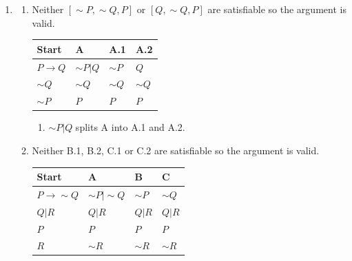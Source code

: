 \documentclass{article}
\begin{document}
\begin{enumerate}
    \newpage
    \item 
    \begin{enumerate}

        \item Neither $[\sim P, \sim Q, P]$ or $[Q, \sim Q, P]$ are satisfiable so the argument is valid.
        \begin{center}
        \setlength{\tabcolsep}{10pt}
        \centering
        \begin{tabular}{ p{1.2cm}|p{1.1cm}|p{1cm}|p{1cm}}
        
            Start & A & A.1 & A.2\\
            \hline
            $P \rightarrow Q$ & $\sim P |Q$ & $\sim P$    & $Q$\\
            $\sim Q$          & $\sim Q$    & $\sim Q$    & $\sim Q$\\ \cline{1-1}
            $\sim P$          & $P$         & $P$         & $P$\\
        \end{tabular}
        \end{center}

        \vspace{20px}
        \begin{enumerate}
            \item $\sim P|Q$ splits A into A.1 and A.2. 
        \end{enumerate}
        
        \vspace{100px}
        
        \item Neither B.1, B.2, C.1 or C.2 are satisfiable so the argument is valid.
        \begin{center}
        \setlength{\tabcolsep}{10pt}
        \centering
        \begin{tabular}{ p{1.4cm}|p{1.5cm}|p{1cm}|p{1cm}}
            
            Start & A & B & C\\
            \hline
            $P \rightarrow \sim Q$ & $\sim P |\sim Q$ & $\sim P$    & $\sim Q$\\
            $Q|R$                  & $Q|R$            & $Q|R$    & $Q|R$\\ 
            $P$                    & $P$              & $P$         & $P$\\ \cline{1-1}
            $R$                    & $\sim R$         & $\sim R$          & $\sim R$\\
        \end{tabular}
        \end{center}


\end{enumerate}
\end{enumerate}
\end{document}
